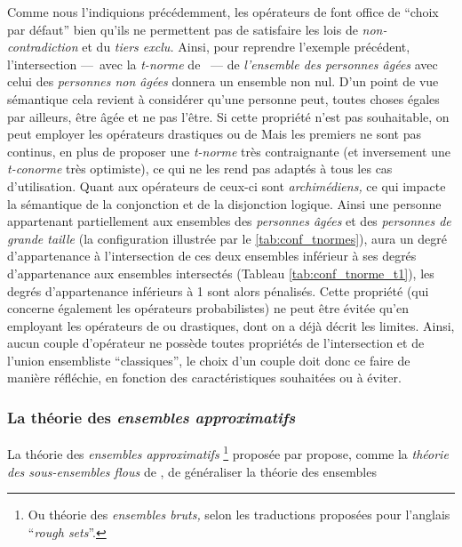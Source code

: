 Comme nous l'indiquions précédemment, les opérateurs de
\textcite{Zadeh1965} font office de \enquote{choix par défaut} bien
qu'ils ne permettent pas de satisfaire les lois de
\emph{non-contradiction} et du \emph{tiers exclu.} Ainsi, pour
reprendre l'exemple précédent, l'intersection ---~avec la
\emph{t-norme} de \textcite{Zadeh1965}~--- de \emph{l'ensemble des
  personnes âgées} avec celui des \emph{personnes non âgées} donnera
un ensemble non nul. D'un point de vue sémantique cela revient à
considérer qu'une personne peut, toutes choses égales par ailleurs,
être âgée et ne pas l'être. Si cette propriété n'est pas souhaitable,
on peut employer les opérateurs drastiques ou de 
Mais les premiers ne sont pas continus, en plus de proposer une
\emph{t-norme} très contraignante (et inversement une \emph{t-conorme}
très optimiste), ce qui ne les rend pas adaptés à tous les cas
d'utilisation. Quant aux opérateurs de  ceux-ci sont
\emph{archimédiens,} ce qui impacte la sémantique de la conjonction et
de la disjonction logique. Ainsi une personne appartenant
partiellement aux ensembles des \emph{personnes âgées} et des
\emph{personnes de grande taille} (\ie la configuration illustrée par
le \autoref{tab:conf_tnormes}), aura un degré d'appartenance à
l'intersection de ces deux ensembles inférieur à ses degrés
d'appartenance aux ensembles intersectés (Tableau
\ref{tab:conf_tnorme_t1}), les degrés d'appartenance inférieurs à 1
sont alors pénalisés. Cette propriété (qui concerne également les
opérateurs probabilistes) ne peut être évitée qu'en employant les
opérateurs de \textcite{Zadeh1965} ou drastiques, dont on a déjà
décrit les limites. Ainsi, aucun couple d'opérateur ne possède toutes
propriétés de l'intersection et de l'union ensembliste
\enquote{classiques}, le choix d'un couple doit donc ce faire de
manière réfléchie, en fonction des caractéristiques souhaitées ou à
éviter.

\subsubsection{La théorie des \emph{ensembles approximatifs}}


La théorie des \emph{ensembles approximatifs} \footnote{Ou théorie des
  \emph{ensembles bruts,} selon les traductions proposées pour
  l'anglais \foreignquote{english}{\emph{rough sets}}.} proposée par
\textcite{Pawlak1982} propose, comme la \emph{théorie des
  sous-ensembles flous} de \textcite{Zadeh1965}, de généraliser la
théorie des ensembles

